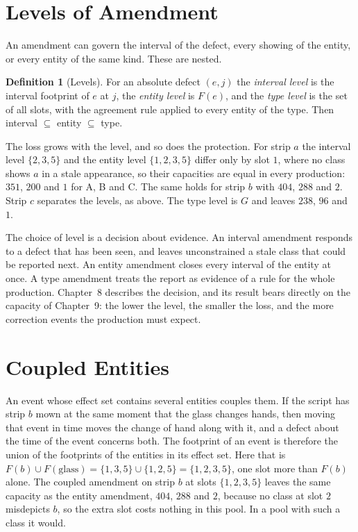 \documentclass[11pt,twoside,openright]{book}
\theoremstyle{plain}
\theoremstyle{definition}
\newtheorem{definition}[theorem]{Definition}
\theoremstyle{remark}
\begin{document}
\section{Levels of Amendment}\label{sec:levels}

An amendment can govern the interval of the defect, every showing of the entity, or every entity of the same kind. These are nested.

\begin{definition}[Levels]\label{def:levels}
For an absolute defect $(e,j)$ the \emph{interval level} is the interval footprint of $e$ at $j$, the \emph{entity level} is $F(e)$, and the \emph{type level} is the set of all slots, with the agreement rule applied to every entity of the type. Then interval $\subseteq$ entity $\subseteq$ type.
\end{definition}

The loss grows with the level, and so does the protection. For strip $a$ the interval level $\{2,3,5\}$ and the entity level $\{1,2,3,5\}$ differ only by slot $1$, where no class shows $a$ in a stale appearance, so their capacities are equal in every production: $351$, $200$ and $1$ for A, B and C. The same holds for strip $b$ with $404$, $288$ and $2$. Strip $c$ separates the levels, as above. The type level is $G$ and leaves $238$, $96$ and $1$.

The choice of level is a decision about evidence. An interval amendment responds to a defect that has been seen, and leaves unconstrained a stale class that could be reported next. An entity amendment closes every interval of the entity at once. A type amendment treats the report as evidence of a rule for the whole production. Chapter~8 describes the decision, and its result bears directly on the capacity of Chapter~9: the lower the level, the smaller the loss, and the more correction events the production must expect.

\section{Coupled Entities}\label{sec:coupled}

An event whose effect set contains several entities couples them. If the script has strip $b$ mown at the same moment that the glass changes hands, then moving that event in time moves the change of hand along with it, and a defect about the time of the event concerns both. The footprint of an event is therefore the union of the footprints of the entities in its effect set. Here that is $F(b)\cup F(\text{glass})=\{1,3,5\}\cup\{1,2,5\}=\{1,2,3,5\}$, one slot more than $F(b)$ alone. The coupled amendment on strip $b$ at slots $\{1,2,3,5\}$ leaves the same capacity as the entity amendment, $404$, $288$ and $2$, because no class at slot $2$ misdepicts $b$, so the extra slot costs nothing in this pool. In a pool with such a class it would.
\end{document}
